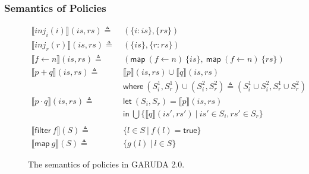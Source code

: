 \documentclass[12pt, letterpaper]{article}
\newcommand\interp[1]{\llbracket #1 \rrbracket}
\def \sysname {\textsc{GARUDA 2.0}\xspace}
\begin{document}
      \subsubsection{Semantics of Policies}\label{sec:spec:sem:pol}
        \begin{figure}
          \centering
          \begin{align*}  
            \interp { inj_{i}(i) }(\mathit{is}, \mathit{rs})
              \triangleq\ &
              (\{\mathit{i : is}\}, \{\mathit{rs}\}) 
              \\
            \interp { inj_{r}(r) }(\mathit{is}, \mathit{rs})
              \triangleq\ &
              (\{\mathit{is}\},\{ \mathit{r : rs}\})
              \\
            \interp { f \leftarrow n }(is, rs)
              \triangleq\ &
              (\mathsf{map}\ (f\leftarrow n)\ \{is\},\
               \mathsf{map}\ (f\leftarrow n)\ \{rs\})
              \\ %
            \interp { p + q }(\mathit{is}, \mathit{rs})
              \triangleq\ &
              \interp { p }(\mathit{is}, \mathit{rs})\cup
              \interp { q }(\mathit{is}, \mathit{rs}) \\
              &\mathsf{where}\ (S_i^1, S_r^1)\cup (S_i^2, S_r^2)\triangleq
                (S_i^1\cup S_i^2, S_r^1\cup S_r^2)\\
            \interp { p \cdot q }(\mathit{is}, \mathit{rs})
              \triangleq\ &
              \mathsf{let}\ (S_i, S_r) = \interp{p}(is, rs)\\
              &\mathsf{in}\ \bigcup \{\interp{q}(\mathit{is}',\mathit{rs}')\ |\ \mathit{is}'\in S_i, \mathit{rs'}\in S_r\}\\
              \\
            \interp{\mathsf{filter}\ f}(S)
              \triangleq\ & \{l \in S\ |\ f(l) = \mathsf{true}\}\\
            \interp{\mathsf{map}\ g}(S)
              \triangleq\ &
              \{ g(l)\ |\ l\in S \} 
          \end{align*}
          \caption{The semantics of policies in \sysname.}
          \label{fig:spec:sem:pol}
        \end{figure}
\end{document}
